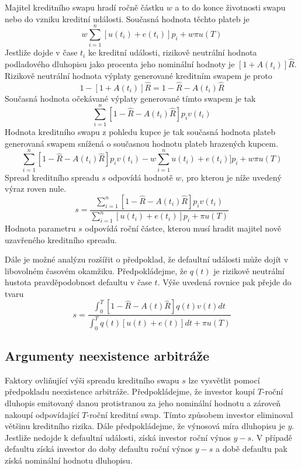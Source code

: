 \documentclass[a4paper]{book}
\begin{document}
Majitel kreditního swapu hradí ročně částku $w$ a to do konce životnosti swapu nebo do vzniku kreditní události. Současná hodnota těchto plateb je
\begin{equation*}
w \sum^n_{i=1}[u(t_i) + e(t_i)]p_i + w\pi u(T)
\end{equation*}
Jestliže dojde v čase $t_i$ ke kreditní události, rizikově neutrální hodnota podladového dluhopisu jako procenta jeho nominální hodnoty je $[1+A(t_i)]\hat{R}$. Rizikově neutrální hodnota výplaty generované kreditním swapem je proto
\begin{equation*}
1 - [1 + A(t_i)]\hat{R} = 1 - \hat{R} - A(t_i)\hat{R}
\end{equation*}
Současná hodnota očekávané výplaty generované tímto swapem je tak
\begin{equation*}
\sum^n_{i=1}[1 - \hat{R} - A(t_i)\hat{R}]p_i v(t_i)
\end{equation*}
Hodnota kreditního swapu z pohledu kupce je tak současná hodnota plateb generovaná swapem snížená o současnou hodnotu plateb hrazených kupcem.
\begin{equation*}
\sum^n_{i=1}[1 - \hat{R} - A(t_i)\hat{R}]p_i v(t_i) - w \sum^n_{i=1}u(t_i) + e(t_i)]p_i + w \pi u(T)
\end{equation*}
Spread kreditního spreadu $s$ odpovídá hodnotě $w$, pro kterou je níže uvedený výraz roven nule.
\begin{equation*}
s = \frac{\sum^n_{i=1}[1 - \hat{R} - A(t_i)\hat{R}]p_i v(t_i)}{\sum^n_{i=1}[u(t_i) + e(t_i)]p_i + \pi u(T)}
\end{equation*}
Hodnota parametru $s$ odpovídá roční částce, kterou musí hradit majitel nově uzavřeného kreditního spreadu.

Dále je možné analýzu rozšířit o předpoklad, že defaultní události může dojít v libovolném časovém okamžiku. Předpokládejme, že $q(t)$ je rizikově neutrální hustota pravděpodobnost defaultu v čase $t$. Výše uvedená rovnice pak přejde do tvaru
\begin{equation}
s = \frac{\int^T_0[1 - \hat{R} - A(t)\hat{R}]q(t)v(t)dt}{\int^T_0 q(t)[u(t) + e(t)]dt + \pi u(T)}
\end{equation}

\subsection{Argumenty neexistence arbitráže}

Faktory ovliňující výši spreadu kreditního swapu $s$ lze vysvětlit pomocí předpokladu neexistence arbitráže. Předpokládejme, že investor koupí $T$-roční dluhopis emitovaný danou protistranou za jeho nominální hodnotu a zároveň nakoupí odpovídající $T$-roční kreditní swap. Tímto způsobem investor eliminoval většinu kreditního rizika. Dále předpokládejme, že výnosová míra dluhopisu je $y$. Jestliže nedojde k defaultní události, získá investor roční výnos $y - s$. V případě defaultu získá investor do doby defaultu roční výnos $y - s$ a době defaultu pak získá nominální hodnotu dluhopisu.
\end{document}
